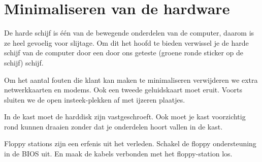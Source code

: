 \section{Minimaliseren van de hardware}
De harde schijf is \'{e}\'{e}n van de bewegende onderdelen van de computer, daarom is ze heel gevoelig voor slijtage. Om dit het hoofd te bieden verwissel je de harde schijf van de computer door een door ons geteste (groene ronde sticker op de schijf) schijf.

Om het aantal fouten die klant kan maken te minimaliseren verwijderen we extra netwerkkaarten en modems. Ook een tweede geluidskaart moet eruit. Voorts sluiten we de open insteek-plekken af met ijzeren plaatjes.

In de kast moet de harddisk zijn vastgeschroeft.
Ook moet je kast voorzichtig rond kunnen draaien zonder dat je onderdelen hoort vallen in de kast. 

Floppy stations zijn een erfenis uit het verleden. Schakel de floppy ondersteuning in de BIOS uit. En maak de kabels verbonden met het floppy-station los.


